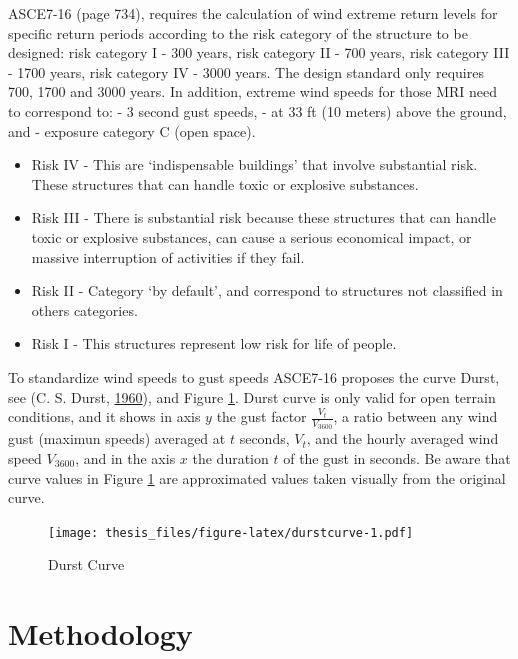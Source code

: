 \documentclass[12pt,oneside]{reedthesis}
\providecommand{\tightlist}{%
  \setlength{\itemsep}{0pt}\setlength{\parskip}{0pt}}
\begin{document}
ASCE7-16 (page 734), requires the calculation of wind extreme return levels for specific return periods according to the risk category of the structure to be designed: risk category I - 300 years, risk category II - 700 years, risk category III - 1700 years, risk category IV - 3000 years. The design standard only requires 700, 1700 and 3000 years. In addition, extreme wind speeds for those MRI need to correspond to: - 3 second gust speeds, - at 33 ft (10 meters) above the ground, and - exposure category C (open space).
\begin{itemize}
\tightlist
\item
  Risk IV - This are `indispensable buildings' that involve substantial risk. These structures that can handle toxic or explosive substances.
\item
  Risk III - There is substantial risk because these structures that can handle toxic or explosive substances, can cause a serious economical impact, or massive interruption of activities if they fail.
\item
  Risk II - Category `by default', and correspond to structures not classified in others categories.
\item
  Risk I - This structures represent low risk for life of people.
\end{itemize}
To standardize wind speeds to gust speeds ASCE7-16 proposes the curve Durst, see (C. S. Durst, \protect\hyperlink{ref-Durst1960}{1960}), and Figure \ref{fig:durstcurve}. Durst curve is only valid for open terrain conditions, and it shows in axis \(y\) the gust factor \(\frac{V_t}{V_{3600}}\), a ratio between any wind gust (maximun speeds) averaged at \(t\) seconds, \(V_t\), and the hourly averaged wind speed \(V_{3600}\), and in the axis \(x\) the duration \(t\) of the gust in seconds. Be aware that curve values in Figure \ref{fig:durstcurve} are approximated values taken visually from the original curve.
\begin{figure}
\centering
\texttt{[image: thesis\_files/figure-latex/durstcurve-1.pdf]}
\caption{\label{fig:durstcurve}Durst Curve}
\end{figure}
\hypertarget{rmd-method}{%
\chapter{Methodology}\label{rmd-method}}
\end{document}

